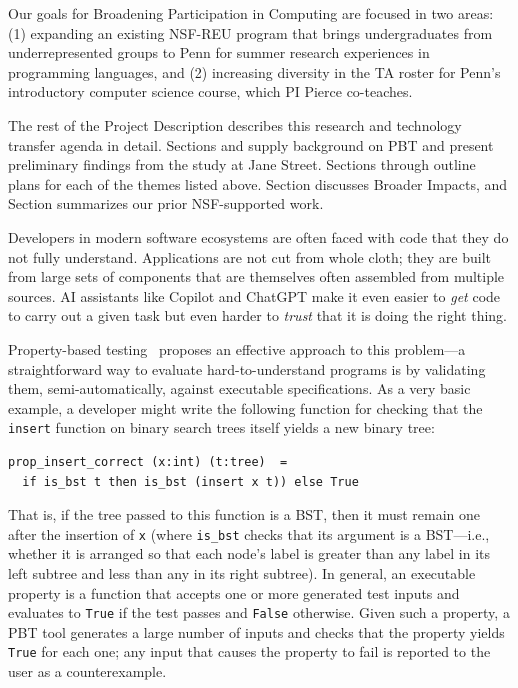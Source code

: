 %
Our goals for Broadening Participation in Computing are focused in two
areas: (1) expanding an
existing NSF-REU program that brings undergraduates from
underrepresented groups to Penn for summer research experiences in
programming languages, and (2) increasing diversity in the TA roster
for Penn's introductory computer science course, which PI Pierce
co-teaches.

\medskip

The rest of the Project Description describes this research and
technology transfer agenda in detail.  Sections
 and  supply
background on PBT and present preliminary findings from the
study at Jane Street.
%
Sections  through
 outline plans for each of the
themes listed above.
Section 
discusses Broader Impacts, and
Section  summarizes our prior
NSF-supported work.

Developers in modern software ecosystems are often faced with code
that they do not fully understand. Applications are not cut from whole cloth;
they are built from large sets of components that are themselves often
assembled from multiple sources.
AI assistants like Copilot and ChatGPT make it even
easier to {\em get} code to carry out a given task but even harder to
{\em trust} that it is doing the right thing.

Property-based testing~\cite{hughes_quickcheck_2007} proposes an
effective approach to this problem---a straightforward way to evaluate
hard-to-understand programs is by validating them, semi-automatically,
against executable specifications. As a very basic example, a
developer might write the following function for checking that
the \lstinline{insert} function on binary search trees itself yields a new
binary tree:
\begin{lstlisting}
prop_insert_correct (x:int) (t:tree)  =
  if is_bst t then is_bst (insert x t)) else True
\end{lstlisting}
That is, if the tree passed to this function
is a BST, then it must remain
one after the insertion of \texttt{x} (where
\lstinline{is_bst} checks that its argument is a BST---i.e., whether it
is arranged so that each node's label is greater
than any label in its left subtree and less than any in its right
subtree).
%
In general, an executable property is a function that
accepts one or more generated
test inputs
and evaluates to \lstinline{True} if the test passes and
\lstinline{False} otherwise.
Given such a property, a PBT tool generates a
large number of inputs and
checks that the property yields \lstinline{True} for each one; any input
that causes the property to fail is reported to the user as a
{counterexample}.
%

